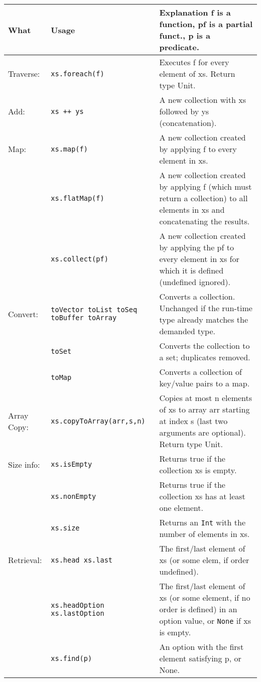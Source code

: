 \documentclass[article, a5paper]{memoir}
\newcommand{\LangColor}{red}
\newcommand{\head}[1]{{\bfseries {\color{\LangColor}{#1}}\par\vspace{1mm}\hrule\vspace{-2mm}}}
\renewcommand{\arraystretch}{0.9}
\newcommand{\Newline}{\vspace{\baselineskip}}
\begin{document}
\vspace*{-2.0em}\head{Methods in trait \texttt{Iterable[A]}}\Newline
{\small\renewcommand{\arraystretch}{1.14}
\begin{tabular}{@{}l p{3.6cm} p{6.8cm}}
\textbf{What} & \textbf{Usage} & \textbf{Explanation} f is a function, pf is a partial funct., p is a predicate.\\ \hline
Traverse: & \texttt{xs.foreach(f)} & Executes f for every element of xs. Return type Unit.\\ \cline{1-3}

  Add: & \texttt{xs ++ ys} & A new collection with xs followed by ys (concatenation).\\\cline{1-3}

  Map:     
      & \texttt{xs.map(f)} & A new collection created by applying f to every element in xs.\\ \cline{2-3}
      & \texttt{xs.flatMap(f)} & A new collection created by applying f (which must return a collection) to all elements in xs and concatenating the results.\\ \cline{2-3}
       & \texttt{xs.collect(pf)} & A new collection created by applying the pf to every element in xs for which it is defined (undefined ignored).\\ \cline{1-3}

  Convert: & \texttt{toVector toList toSeq toBuffer toArray} & Converts a collection. Unchanged if the run-time type already matches the demanded type.\\ \cline{2-3}
   & \texttt{toSet} & Converts the collection to a set; duplicates removed.\\ \cline{2-3}
   & \texttt{toMap} & Converts a collection of key/value pairs to a map. \\ \cline{1-3}

   Array Copy:  & \texttt{xs.copyToArray(arr,s,n)} & Copies at most n elements of xs to array arr starting at index s (last two arguments are optional). Return type Unit.\\ \cline{1-3}

  Size info: & \texttt{xs.isEmpty} & Returns true if the collection xs is empty.\\ \cline{2-3}
   & \texttt{xs.nonEmpty} & Returns true if the collection xs has at least one element.\\ \cline{2-3}
   & \texttt{xs.size} & Returns an \texttt{Int} with the number of elements in xs.\\ \cline{1-3}
  Retrieval: & \texttt{xs.head xs.last} &  	The first/last element of xs (or some elem, if order undefined).\\ \cline{2-3}
      & \texttt{xs.headOption \newline xs.lastOption} & The first/last element of xs (or some element, if no order is defined) in an option value, or \texttt{None} if xs is empty.\\ \cline{2-3}
      & \texttt{xs.find(p)} & An option with the first element satisfying p, or None.\\ \cline{1-3}



\end{tabular}}
\end{document}
